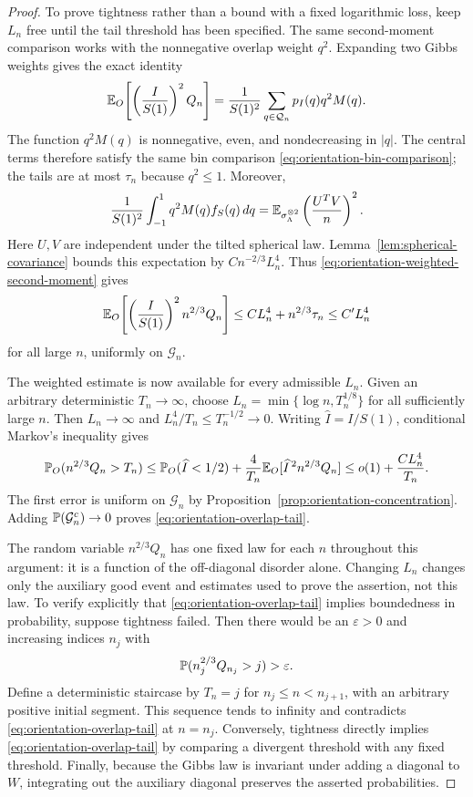 \begin{proof}
To prove tightness rather than a bound with a fixed logarithmic
loss, keep $L_n$ free until the tail threshold has been specified.
The same second-moment comparison works with the nonnegative overlap
weight $q^2$. Expanding two Gibbs weights gives the exact identity
\begin{equation}
 \mathbb E_O\!\left[\left(\frac I{S(1)}\right)^2Q_n\right]
 =\frac1{S(1)^2}\sum_{q\in\mathcal Q_n}p_I(q)q^2M(q).
 \label{eq:orientation-weighted-second-moment}
\end{equation}
The function $q^2M(q)$ is nonnegative, even, and nondecreasing in $|q|$.
The central terms therefore satisfy the same bin comparison
\eqref{eq:orientation-bin-comparison}; the tails are at most $\tau_n$
because $q^2\le1$.  Moreover,
\[
 \frac1{S(1)^2}\int_{-1}^1q^2M(q)f_S(q)\,dq
 =\mathbb E_{\sigma_\Lambda^{\otimes2}}
       \left(\frac{U^TV}{n}\right)^2.
\]
Here $U,V$ are independent under the tilted spherical law.
Lemma~\ref{lem:spherical-covariance} bounds this expectation by
$Cn^{-2/3}L_n^4$.  Thus \eqref{eq:orientation-weighted-second-moment} gives
\begin{equation}
 \mathbb E_O\!\left[\left(\frac I{S(1)}\right)^2 n^{2/3}Q_n\right]
 \le CL_n^4+n^{2/3}\tau_n
 \le C'L_n^4
 \label{eq:orientation-weighted-bound}
\end{equation}
for all large $n$, uniformly on $\mathcal G_n$.

The weighted estimate is now available for every admissible $L_n$.
Given an arbitrary deterministic $T_n\to\infty$, choose
$L_n=\min\{\log n,T_n^{1/8}\}$ for all sufficiently large $n$.
Then $L_n\to\infty$ and $L_n^4/T_n\le T_n^{-1/2}\to0$.
Writing $\widehat I=I/S(1)$, conditional Markov's inequality gives
\[
 \mathbb P_O(n^{2/3}Q_n>T_n)
 \le \mathbb P_O(\widehat I<1/2)
       +\frac4{T_n}\mathbb E_O[\widehat I^{\,2} n^{2/3}Q_n]
 \le o(1)+\frac{CL_n^4}{T_n}.
\]
The first error is uniform on $\mathcal G_n$ by
Proposition~\ref{prop:orientation-concentration}.
Adding $\mathbb P(\mathcal G_n^c)\to0$ proves
\eqref{eq:orientation-overlap-tail}.

The random variable $n^{2/3}Q_n$ has one fixed law for each $n$ throughout
this argument: it is a function of the off-diagonal disorder alone.
Changing $L_n$ changes only the auxiliary good event and estimates used
to prove the assertion, not this law.  To verify explicitly that
\eqref{eq:orientation-overlap-tail} implies boundedness in probability,
suppose tightness failed.  Then there would be an $\varepsilon>0$ and
increasing indices $n_j$ with
\[
 \mathbb P(n_j^{2/3}Q_{n_j}>j)>\varepsilon.
\]
Define a deterministic staircase by $T_n=j$ for $n_j\le n<n_{j+1}$, with
an arbitrary positive initial segment.  This sequence tends to infinity
and contradicts \eqref{eq:orientation-overlap-tail} at $n=n_j$.
Conversely, tightness directly implies
\eqref{eq:orientation-overlap-tail} by comparing a divergent threshold
with any fixed threshold.  Finally, because the Gibbs law is invariant
under adding a diagonal to $W$, integrating out the auxiliary diagonal
preserves the asserted probabilities.
\end{proof}

